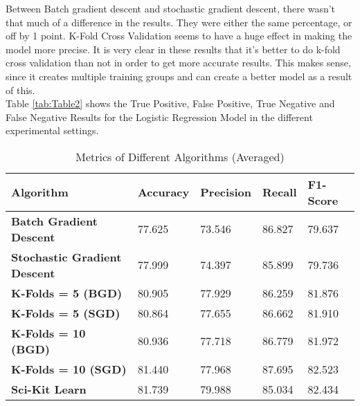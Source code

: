 \noindent Between Batch gradient descent and stochastic gradient descent, there wasn’t that much of a difference in the results. They were either the same percentage, or off by 1 point. K-Fold Cross Validation seems to have a huge effect in making the model more precise. It is very clear in these results that it’s better to do k-fold cross validation than not in order to get more accurate results. This makes sense, since it creates multiple training groups and can create a better model as a result of this.\\

\noindent Table \ref{tab:Table2} shows the True Positive, False Positive, True Negative and False Negative Results for the Logistic Regression Model in the different experimental settings.

\begin{table}[ht]
    \centering
    \begin{tabular}{|l|l|l|l|l|}
        \hline
        \textbf{Algorithm}                   & \textbf{Accuracy} & \textbf{Precision} & \textbf{Recall} & \textbf{F1-Score} \\
        \hline
        \textbf{Batch Gradient Descent}      & 77.625            & 73.546             & 86.827          & 79.637            \\
        \textbf{Stochastic Gradient Descent} & 77.999            & 74.397             & 85.899          & 79.736            \\
        \textbf{K-Folds = 5 (BGD)}           & 80.905            & 77.929             & 86.259          & 81.876            \\
        \textbf{K-Folds = 5 (SGD)}           & 80.864            & 77.655             & 86.662          & 81.910            \\
        \textbf{K-Folds = 10 (BGD)}          & 80.936            & 77.718             & 86.779          & 81.972            \\
        \textbf{K-Folds = 10 (SGD)}          & 81.440            & 77.968             & 87.695          & 82.523            \\
        \textbf{Sci-Kit Learn}               & 81.739            & 79.988             & 85.034          & 82.434            \\
        \hline
    \end{tabular}
    \caption{Metrics of Different Algorithms (Averaged)}
    \label{tab:Table1}
\end{table}

